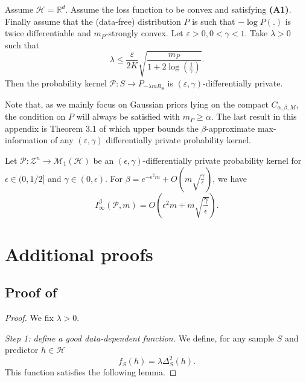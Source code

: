 \begin{noaddcontents}
\begin{proposition}
\label{prop: minami}
Assume $\mathcal{H}=\mathbb{R}^d$. Assume the loss function to be convex and satisfying \textbf{(A1)}. Finally assume that the (data-free) distribution $P$ is such that $-\log P(.)$ is twice differentiable and $m_P$-strongly convex.
Let $\varepsilon>0, 0<\gamma<1$. Take $\lambda>0$ such that
\[ \lambda \leq \frac{\varepsilon}{2K}\sqrt{\frac{m_P}{1+ 2 \log\left( \frac{1}{\gamma}  \right)}}.  \]
Then the probability kernel $\mathcal{P} : S \rightarrow P_{-\lambda m R_S}$ is $(\varepsilon,\gamma)$-differentially private.
\end{proposition}
Note that, as we mainly focus on Gaussian priors lying on the compact $C_{\alpha,\beta,M}$, the condition on $P$ will always be satisfied with $m_P\geq \alpha$. The last result in this appendix is Theorem 3.1 of \citet{rogers2016max} which upper bounds the $\beta$-approximate max-information of any $(\varepsilon,\gamma)$ differentially private probability kernel.

\begin{proposition}
\label{prop: rogers}
Let $\mathcal{P}: \mathcal{Z}^n \rightarrow \mathcal{M}_1(\mathcal{H})$ be an $(\epsilon, \gamma)$-differentially private probability kernel for $\epsilon \in(0,1 / 2]$ and $\gamma \in(0, \epsilon)$.
For $\beta=e^{-\epsilon^2 m}+O\left(m \sqrt{\frac{\gamma}{\epsilon}}\right)$, we have
$$
I_{\infty}^\beta(\mathcal{P}, m)=O\left(\epsilon^2 m + m \sqrt{\frac{\gamma}{\epsilon}}\right) .
$$
\end{proposition}



 
\section{Additional proofs}
\label{sec: proofs}
\subsection{Proof of }
\label{sec: proof_compact_mcall}

\begin{proof}
We fix $\lambda>0$.

\textit{Step 1: define a good data-dependent function.} We define, for any sample $S$ and predictor $h\in \mathcal{H}$
\[ f_S(h) = \lambda \Delta_S^2(h). \]
This function satisfies the following lemma.


\end{proof}
\end{noaddcontents}

